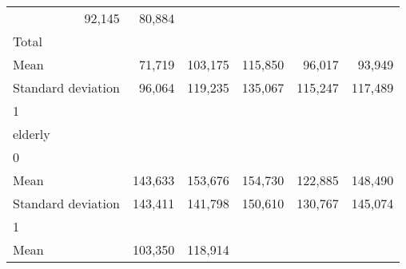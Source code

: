 \begin{tabular}{llllll}
  \multicolumn{1}{r}{92,145} &
  \multicolumn{1}{r}{80,884} \\
\multicolumn{1}{l}{\hspace{3em}Total} &
  \multicolumn{1}{|r}{} &
  \multicolumn{1}{r}{} &
  \multicolumn{1}{r}{} &
  \multicolumn{1}{r}{} &
  \multicolumn{1}{r}{} \\
\multicolumn{1}{l}{\hspace{4em}Mean} &
  \multicolumn{1}{|r}{71,719} &
  \multicolumn{1}{r}{103,175} &
  \multicolumn{1}{r}{115,850} &
  \multicolumn{1}{r}{96,017} &
  \multicolumn{1}{r}{93,949} \\
\multicolumn{1}{l}{\hspace{4em}Standard deviation} &
  \multicolumn{1}{|r}{96,064} &
  \multicolumn{1}{r}{119,235} &
  \multicolumn{1}{r}{135,067} &
  \multicolumn{1}{r}{115,247} &
  \multicolumn{1}{r}{117,489} \\
\multicolumn{1}{l}{\hspace{1em}1} &
  \multicolumn{1}{|r}{} &
  \multicolumn{1}{r}{} &
  \multicolumn{1}{r}{} &
  \multicolumn{1}{r}{} &
  \multicolumn{1}{r}{} \\
\multicolumn{1}{l}{\hspace{2em}elderly} &
  \multicolumn{1}{|r}{} &
  \multicolumn{1}{r}{} &
  \multicolumn{1}{r}{} &
  \multicolumn{1}{r}{} &
  \multicolumn{1}{r}{} \\
\multicolumn{1}{l}{\hspace{3em}0} &
  \multicolumn{1}{|r}{} &
  \multicolumn{1}{r}{} &
  \multicolumn{1}{r}{} &
  \multicolumn{1}{r}{} &
  \multicolumn{1}{r}{} \\
\multicolumn{1}{l}{\hspace{4em}Mean} &
  \multicolumn{1}{|r}{143,633} &
  \multicolumn{1}{r}{153,676} &
  \multicolumn{1}{r}{154,730} &
  \multicolumn{1}{r}{122,885} &
  \multicolumn{1}{r}{148,490} \\
\multicolumn{1}{l}{\hspace{4em}Standard deviation} &
  \multicolumn{1}{|r}{143,411} &
  \multicolumn{1}{r}{141,798} &
  \multicolumn{1}{r}{150,610} &
  \multicolumn{1}{r}{130,767} &
  \multicolumn{1}{r}{145,074} \\
\multicolumn{1}{l}{\hspace{3em}1} &
  \multicolumn{1}{|r}{} &
  \multicolumn{1}{r}{} &
  \multicolumn{1}{r}{} &
  \multicolumn{1}{r}{} &
  \multicolumn{1}{r}{} \\
\multicolumn{1}{l}{\hspace{4em}Mean} &
  \multicolumn{1}{|r}{103,350} &
  \multicolumn{1}{r}{118,914} &

\end{tabular}
